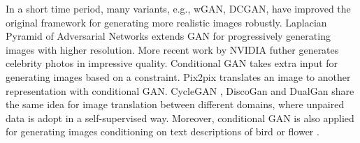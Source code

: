 In a short time period, many variants, e.g., wGAN\cite{wgan}, DCGAN\cite{dcgan}, have improved the original framework for generating more realistic images robustly.
%
Laplacian Pyramid of Adversarial Networks \cite{lapgan} extends GAN for progressively generating images with higher resolution. More recent work by NVIDIA \cite{nvidia_celebrity} futher generates celebrity photos in impressive quality. 
%
Conditional GAN \cite{cgan} takes extra input for generating images based on a constraint.
%
Pix2pix \cite{pix2pix} translates an image to another representation with conditional GAN. 
CycleGAN \cite{CycleGAN2017}, DiscoGan \cite{Kim2017LearningTD} and DualGan \cite{Yi2017DualGANUD} share the same idea for image translation between different domains, where unpaired data is adopt in a self-supervised way. 
%
Moreover, conditional GAN is also applied for generating images conditioning on text descriptions \cite{icml16,stackgan,auxgan} of bird \cite{cub} or flower \cite{flower}.





